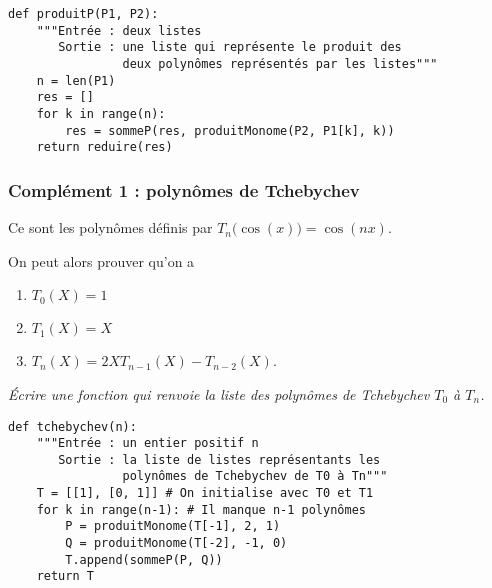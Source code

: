 \begin{Answer}
\begin{lstlisting}
def produitP(P1, P2):
    """Entrée : deux listes 
       Sortie : une liste qui représente le produit des
                deux polynômes représentés par les listes"""
    n = len(P1)
    res = []
    for k in range(n):
        res = sommeP(res, produitMonome(P2, P1[k], k))
    return reduire(res)
\end{lstlisting}
\end{Answer}
\subsubsection{Complément 1 : polynômes de Tchebychev}
Ce sont les polynômes définis par $T_n\bigl(\cos(x)\bigr) = \cos(nx)$.

On peut alors prouver qu'on a 
\begin{enumerate}
  \item $T_0(X)=1$
  \item $T_1(X)=X$
  \item $T_{n}(X) = 2XT_{n-1}(X)-T_{n-2}(X)$.
\end{enumerate}
\begin{Exercise}\it Écrire une fonction  qui renvoie la liste des polynômes de Tchebychev $T_0$ à $T_n$.
\end{Exercise}
\begin{Answer}
\begin{lstlisting}
def tchebychev(n):
    """Entrée : un entier positif n
       Sortie : la liste de listes représentants les
                polynômes de Tchebychev de T0 à Tn"""
    T = [[1], [0, 1]] # On initialise avec T0 et T1
    for k in range(n-1): # Il manque n-1 polynômes
        P = produitMonome(T[-1], 2, 1)
        Q = produitMonome(T[-2], -1, 0)
        T.append(sommeP(P, Q))
    return T
\end{lstlisting}
\end{Answer}
